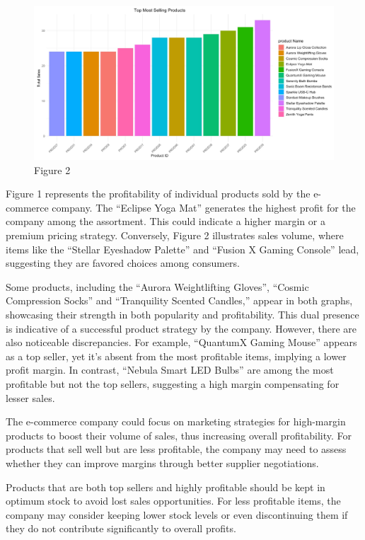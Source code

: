 \documentclass[
  letterpaper,
  DIV=11,
  numbers=noendperiod]{scrartcl}
\begin{document}
\begin{figure}

{\centering \includegraphics{images/Figure 2.jpeg}

}

\caption{Figure 2}

\end{figure}

Figure 1 represents the profitability of individual products sold by the
e-commerce company. The ``Eclipse Yoga Mat'' generates the highest
profit for the company among the assortment. This could indicate a
higher margin or a premium pricing strategy. Conversely, Figure 2
illustrates sales volume, where items like the ``Stellar Eyeshadow
Palette'' and ``Fusion X Gaming Console'' lead, suggesting they are
favored choices among consumers.

Some products, including the ``Aurora Weightlifting Gloves'', ``Cosmic
Compression Socks'' and ``Tranquility Scented Candles,'' appear in both
graphs, showcasing their strength in both popularity and profitability.
This dual presence is indicative of a successful product strategy by the
company. However, there are also noticeable discrepancies. For example,
``QuantumX Gaming Mouse'' appears as a top seller, yet it's absent from
the most profitable items, implying a lower profit margin. In contrast,
``Nebula Smart LED Bulbs'' are among the most profitable but not the top
sellers, suggesting a high margin compensating for lesser sales.

The e-commerce company could focus on marketing strategies for
high-margin products to boost their volume of sales, thus increasing
overall profitability. For products that sell well but are less
profitable, the company may need to assess whether they can improve
margins through better supplier negotiations.

Products that are both top sellers and highly profitable should be kept
in optimum stock to avoid lost sales opportunities. For less profitable
items, the company may consider keeping lower stock levels or even
discontinuing them if they do not contribute significantly to overall
profits.
\end{document}

